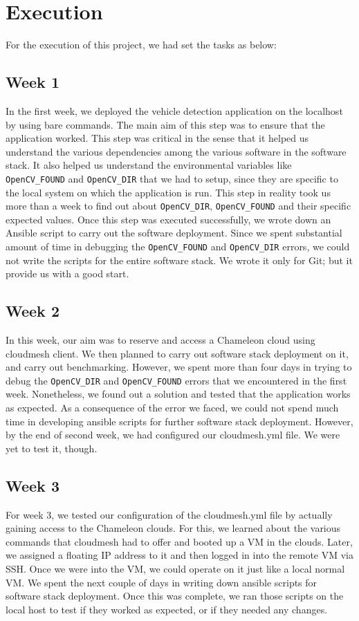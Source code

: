 \documentclass[9pt,twocolumn,twoside]{../../styles/osajnl}
\begin{document}
\section{Execution}
For the execution of this project, we had set the tasks as below:

\subsection{Week 1}
In the first week, we deployed the vehicle detection application on
the localhost by using bare commands.  The main aim of this step was
to ensure that the application worked.  This step was critical in the
sense that it helped us understand the various dependencies among the
various software in the software stack.  It also helped us understand
the environmental variables like \texttt{OpenCV\_FOUND} and
\texttt{OpenCV\_DIR} that we had to setup, since they are specific to
the local system on which the application is run.  This step in
reality took us more than a week to find out about
\texttt{OpenCV\_DIR}, \texttt{OpenCV\_FOUND} and their specific expected
values.  Once this step was executed successfully, we wrote down an
Ansible script to carry out the software deployment.  Since we spent
substantial amount of time in debugging the \texttt{OpenCV\_FOUND} and
\texttt{OpenCV\_DIR} errors, we could not write the scripts for the
entire software stack.  We wrote it only for Git; but it provide us
with a good start.

\subsection{Week 2}
In this week, our aim was to reserve and access a Chameleon cloud
using cloudmesh client.  We then planned to carry out software stack
deployment on it, and carry out benchmarking.  However, we spent more
than four days in trying to debug the \texttt{OpenCV\_DIR} and
\texttt{OpenCV\_FOUND} errors that we encountered in the first week.
Nonetheless, we found out a solution and tested that the application
works as expected.  As a consequence of the error we faced, we could
not spend much time in developing ansible scripts for further software
stack deployment.  However, by the end of second week, we had
configured our cloudmesh.yml file.  We were yet to test it, though.

\subsection{Week 3}
For week 3, we tested our configuration of the cloudmesh.yml file by
actually gaining access to the Chameleon clouds.  For this, we learned
about the various commands that cloudmesh had to offer and booted up a
VM in the clouds.  Later, we assigned a floating IP address to it and
then logged in into the remote VM via SSH.  Once we were into the VM,
we could operate on it just like a local normal VM.  We spent the next
couple of days in writing down ansible scripts for software stack
deployment.  Once this was complete, we ran those scripts on the local
host to test if they worked as expected, or if they needed any
changes.
\end{document}
